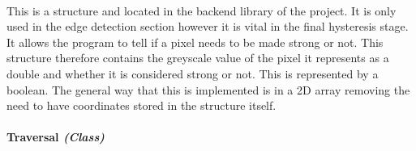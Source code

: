 \begin{FlushLeft}
    \begin{figure}[H]
        \centering
    \end{figure}\\

    This is a structure and located in the backend library of the project. It is only used in the edge detection section however it is vital in the final hysteresis stage. It allows the program to tell if a pixel needs to be made strong or not. This structure therefore contains the greyscale value of the pixel it represents as a double and whether it is considered strong or not. This is represented by a boolean. The general way that this is implemented is in a 2D array removing the need to have coordinates stored in the structure itself.

    \bk

    \pagebreak
\paragraph{Traversal \textit{(Class)}} \mbox{} \\

    \begin{figure}[H]
        \centering
    \end{figure}\\


\end{FlushLeft}
